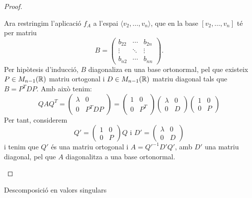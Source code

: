 \documentclass[
  11pt,
]{book}
\makeatletter
\numberwithin{dummy}{section}
\theoremstyle{maincolornumbox}
\theoremstyle{blacknumex}
\theoremstyle{blacknumbox}
\theoremstyle{maincolornum}
\renewcommand{\section}{\@startsection{section}{1}{\z@}
{-4ex \@plus -1ex \@minus -.4ex}
{1ex \@plus.2ex }
{\normalfont\large\sffamily\bfseries}}
\newlength\esp
\makeatother
\begin{document}
\begin{proof}
\begin{itemize}
  Ara restringim l'aplicació \(f_A\) a l'espai
  \(\langle v_2, \dots , v_n\rangle\), que en la base
  \([v_2, \dots , v_n]\) té per matriu
  \[B=\begin{pmatrix} b_{22} & \cdots & b_{2n} \\
      \vdots & \ddots & \vdots \\
      b_{n2} & \cdots  & b_{nn}
      \end{pmatrix} .\] Per hipòtesis d'inducció, \(B\) diagonaliza en
  una base ortonormal, pel que existeix \(P\in M_{n-1}(\mathbb{R})\) matriu
  ortogonal i \(D\in M_{n-1}(\mathbb{R})\) matriu diagonal tals que \(B=P^TDP\).
  Amb això tenim: \[QAQ^T=\left(\begin{array}{c|c}
          \lambda & 0 \\ \hline
          0 & P^T D P
      \end{array}\right)=
      \left(\begin{array}{c|c}
          1 & 0 \\ \hline
          0 & P^T
      \end{array}\right)
      \left(\begin{array}{c|c}
          \lambda & 0 \\ \hline
          0 & D 
      \end{array}\right)
      \left(\begin{array}{c|c}
          1 & 0 \\ \hline
          0 &  P
      \end{array}\right)\] Per tant, considerem
  \[Q'=\left(\begin{array}{c|c}
          1 & 0 \\ \hline
          0 &  P
      \end{array}\right) Q \text{ i }
      D'=\left(\begin{array}{c|c}
          \lambda & 0 \\ \hline
          0 & D 
      \end{array}\right)\] i tenim que \(Q'\) és una matriu ortogonal i
  \(A=Q'^{-1} D' Q'\), amb \(D'\) una matriu diagonal, pel que \(A\)
  diagonalitza a una base ortonormal.
\end{itemize}

\end{proof}

\section{Descomposició en valors singulars}\label{descomposiciuxf3-en-valors-singulars}
\end{document}

